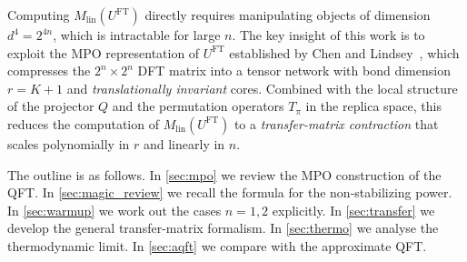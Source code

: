 \documentclass[11pt,a4paper]{article}
\theoremstyle{definition}
\theoremstyle{remark}
\newcommand{\Mlin}{M_{\mathrm{lin}}}
\newcommand{\UFT}{U^{\mathrm{FT}}}
\begin{document}
Computing $\Mlin(\UFT)$ directly requires manipulating objects of dimension $d^4 = 2^{4n}$, which is intractable for large $n$.
The key insight of this work is to exploit the MPO representation of $\UFT$ established by Chen and Lindsey~\cite{ChenLindsey2026}, which compresses the $2^n\times 2^n$ DFT matrix into a tensor network with bond dimension $r = K+1$ and \emph{translationally invariant} cores.
Combined with the local structure of the projector $Q$ and the permutation operators $T_\pi$ in the replica space, this reduces the computation of $\Mlin(\UFT)$ to a \emph{transfer-matrix contraction} that scales polynomially in $r$ and linearly in $n$.

The outline is as follows.
In \cref{sec:mpo} we review the MPO construction of the QFT.
In \cref{sec:magic_review} we recall the formula for the non-stabilizing power.
In \cref{sec:warmup} we work out the cases $n=1,2$ explicitly.
In \cref{sec:transfer} we develop the general transfer-matrix formalism.
In \cref{sec:thermo} we analyse the thermodynamic limit.
In \cref{sec:aqft} we compare with the approximate QFT.
\end{document}
